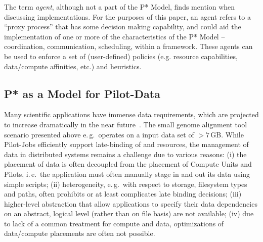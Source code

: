 \documentclass[conference]{IEEEtran}
\begin{document}
The term {\it agent}, although not a part of the P* Model, finds
mention when discussing implementations. For the purposes of this
paper, an agent refers to a ``proxy process'' 
that has some decision making capability, and could aid the
implementation of one or more of the characteristics of the P* Model
-- coordination, communication, scheduling, within a \pilotjob
framework.  These agents can be used to enforce a set of
(user-defined) policies (e.g.  resource capabilities, data/compute
affinities, etc.) and heuristics.




\subsection{P* as a Model for Pilot-Data}
\label{sec:pilot-data}




Many scientific applications have immense data requirements, which are
projected to increase dramatically in the near
future~\cite{hey2009}. The small genome alignment tool
scenario presented above e.\,g.\ operates on a input data set of
$>7$\,GB. While Pilot-Jobs efficiently support late-binding of
\computeunits and resources, the management of data in distributed
systems remains a challenge due to various reasons: (i) the placement
of data is often decoupled from the placement of Compute Units and
Pilots, i.\,e.\ the application must often manually stage in and out
its data using simple scripts;  (ii) heterogeneity, e.\,g.\ with
respect to storage, filesystem types and paths, often prohibits or at
least complicates late binding decisions; (iii) higher-level
abstraction that allow applications to specify their data dependencies
on an abstract, logical level (rather than on file basis) are not
available; (iv) due to lack of a common treatment for compute and
data, optimizations of data/compute placements are often not
possible. 
\end{document}
